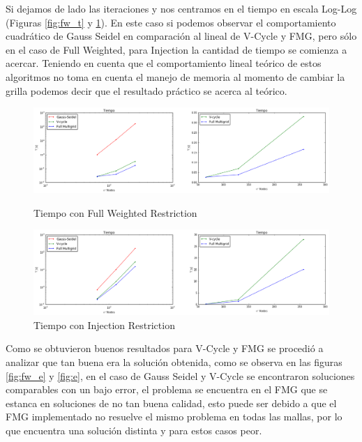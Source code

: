 \documentclass[letter, 10pt]{article}
\begin{document}
Si dejamos de lado las iteraciones y nos centramos en el tiempo en escala Log-Log (Figuras \ref{fig:fw_t} y \ref{fig:t}). En este caso si podemos observar el comportamiento cuadrático de Gauss Seidel en comparación al lineal de V-Cycle y FMG, pero sólo en el caso de Full Weighted, para Injection la cantidad de tiempo se comienza a acercar. Teniendo en cuenta que el comportamiento lineal teórico de estos algoritmos no toma en cuenta el manejo de memoria al momento de cambiar la grilla podemos decir que el resultado práctico se acerca al teórico.
\begin{figure}[H]
    \centering
    \includegraphics[scale=0.4]{fw_t.png}
    \caption{Tiempo con Full Weighted Restriction}
    \label{fig:fw_t}
    \includegraphics[scale=0.4]{injection_t.png}
    \caption{Tiempo con Injection Restriction}
    \label{fig:t}
\end{figure}


Como se obtuvieron buenos resultados para V-Cycle y FMG se procedió a analizar que tan buena era la solución obtenida, como se observa en las figuras \ref{fig:fw_e} y \ref{fig:e}, en el caso de Gauss Seidel y V-Cycle se encontraron soluciones comparables con un bajo error, el problema se encuentra en el FMG que se estanca en soluciones de no tan buena calidad, esto puede ser debido a que el FMG implementado no resuelve el mismo problema en todas las mallas, por lo que encuentra una solución distinta y para estos casos peor.
\end{document}
